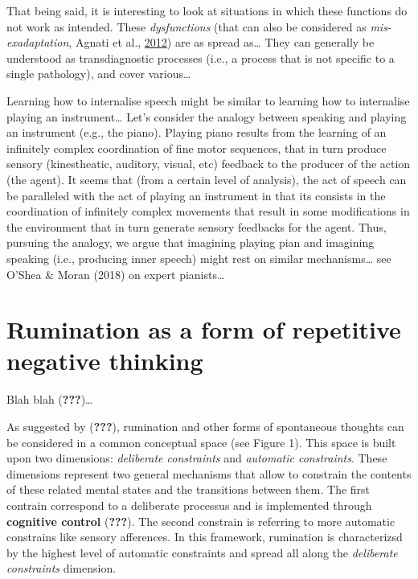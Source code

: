 \documentclass[a4paper,12pt,twoside,openright,oldfontcommands]{memoir}
\begin{document}
That being said, it is interesting to look at situations in which these
functions do not work as intended. These \emph{dysfunctions} (that can
also be considered as \emph{mis-exadaptation}, Agnati et al.,
\protect\hyperlink{ref-agnati_possible_2012}{2012}) are as spread
as\ldots{} They can generally be understood as transdiagnostic processes
(i.e., a process that is not specific to a single pathology), and cover
various\ldots{}

Learning how to internalise speech might be similar to learning how to
internalise playing an instrument\ldots{} Let's consider the analogy
between speaking and playing an instrument (e.g., the piano). Playing
piano results from the learning of an infinitely complex coordination of
fine motor sequences, that in turn produce sensory (kinestheatic,
auditory, visual, etc) feedback to the producer of the action (the
agent). It seems that (from a certain level of analysis), the act of
speech can be paralleled with the act of playing an instrument in that
its consists in the coordination of infinitely complex movements that
result in some modifications in the environment that in turn generate
sensory feedbacks for the agent. Thus, pursuing the analogy, we argue
that imagining playing pian and imagining speaking (i.e., producing
inner speech) might rest on similar mechanisms\ldots{} see O'Shea \&
Moran (2018) on expert pianists\ldots{}

\section{Rumination as a form of repetitive negative
thinking}\label{rumination-as-a-form-of-repetitive-negative-thinking}

Blah blah ({\textbf{???}})\ldots{}

As suggested by ({\textbf{???}}), rumination and other forms of
spontaneous thoughts can be considered in a common conceptual space (see
Figure 1). This space is built upon two dimensions: \emph{deliberate
constraints} and \emph{automatic constraints}. These dimensions
represent two general mechanisms that allow to constrain the contents of
these related mental states and the transitions between them. The first
contrain correspond to a deliberate processus and is implemented through
\textbf{cognitive control} ({\textbf{???}}). The second constrain is
referring to more automatic constrains like sensory afferences. In this
framework, rumination is characterizsd by the highest level of automatic
constraints and spread all along the \emph{deliberate constraints}
dimension.
\end{document}
